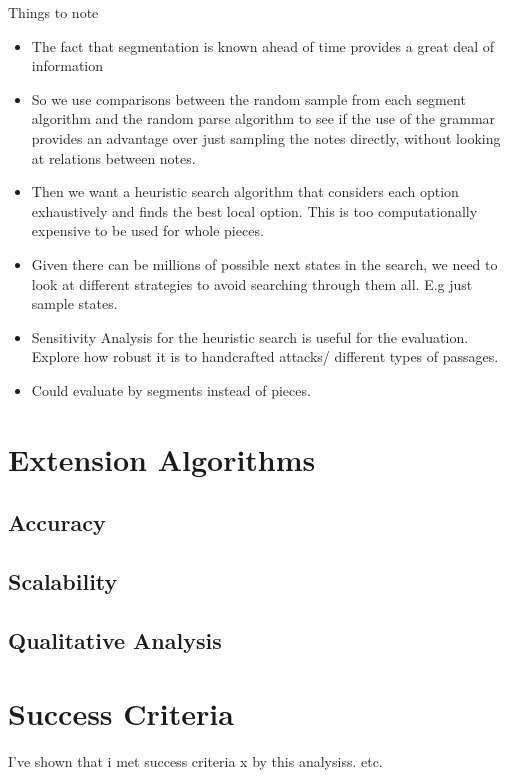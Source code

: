 \documentclass[12pt,a4paper,twoside,openright]{report}
\theoremstyle{definition}
\begin{document}
Things to note
\begin{itemize}
  \item The fact that segmentation is known ahead of time provides a great deal of information \cite{gothamWhatIfWhen2021}
  \item So we use comparisons between the random sample from each segment algorithm and the random parse algorithm to see if the use of the grammar provides an advantage over just sampling the notes directly, without looking at relations between notes.
  \item Then we want a heuristic search algorithm that considers each option exhaustively and finds the best local option. This is too computationally expensive to be used for whole pieces. 
  \item Given there can be millions of possible next states in the search, we need to look at different strategies to avoid searching through them all. E.g just sample states. 
  \item Sensitivity Analysis for the heuristic search is useful for the evaluation. Explore how robust it is to handcrafted attacks/ different types of passages.
  \item Could evaluate by segments instead of pieces. 
\end{itemize}

\section{Extension Algorithms}

\subsection{Accuracy}

\subsection{Scalability}

\subsection{Qualitative Analysis}

\section{Success Criteria}

I've shown that i met success criteria x by this analysiss. etc.
\end{document}
